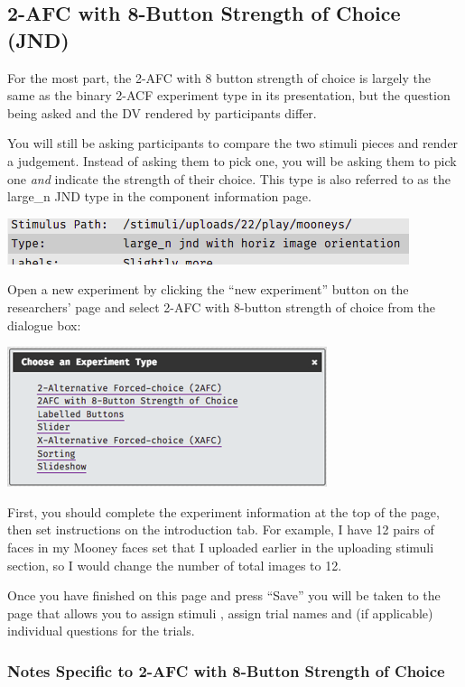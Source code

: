 \documentclass[]{book}
\begin{document}
\subsection{2-AFC with 8-Button Strength of Choice
(JND)}\label{afc-with-8-button-strength-of-choice-jnd}

For the most part, the 2-AFC with 8 button strength of choice is largely
the same as the binary 2-ACF experiment type in its presentation, but
the question being asked and the DV rendered by participants differ.

You will still be asking participants to compare the two stimuli pieces
and render a judgement. Instead of asking them to pick one, you will be
asking them to pick one \emph{and} indicate the strength of their
choice. This type is also referred to as the large\_n JND type in the
component information page.

\includegraphics{images/screenshots/jnd.png}

Open a new experiment by clicking the ``new experiment'' button on the
researchers' page and select 2-AFC with 8-button strength of choice from
the dialogue box:

\includegraphics{images/screenshots/exp_2.png}

First, you should complete the experiment information at the top of the
page, then set instructions on the introduction tab. For example, I have
12 pairs of faces in my Mooney faces set that I uploaded earlier in the
uploading stimuli section, so I would change the number of total images
to 12.

Once you have finished on this page and press ``Save'' you will be taken
to the page that allows you to assign stimuli , assign trial names and
(if applicable) individual questions for the trials.

\subsubsection*{Notes Specific to 2-AFC with 8-Button Strength of
Choice}\label{notes-specific-to-2-afc-with-8-button-strength-of-choice}
\end{document}
